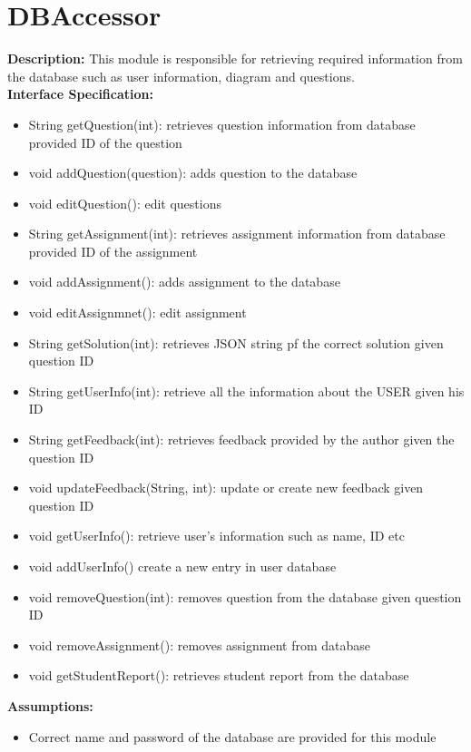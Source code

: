  
\chapter{DBAccessor}
\textbf{Description:}
This module is responsible for retrieving required information from the database such as user information, diagram and questions. \\
\textbf{Interface Specification:}
\begin{itemize}
\item        	String getQuestion(int): retrieves question information from database provided
ID of the question
\item	void addQuestion(question): adds question to the database
\item	void editQuestion(): edit questions
        \item	String getAssignment(int): retrieves assignment information from database provided ID of the assignment
\item	void addAssignment(): adds assignment to the database
	\item void editAssignmnet(): edit assignment
        \item 	String getSolution(int): retrieves JSON string pf the correct solution given question ID
        \item 	String getUserInfo(int): retrieve all the information about the USER given his ID
	\item String getFeedback(int): retrieves feedback provided by the author given the question ID
	\item void updateFeedback(String, int): update or create new feedback given question ID
        \item 	void getUserInfo(): retrieve user’s information such as name, ID etc
\item 	void addUserInfo() create a new entry in user database
\item 	void removeQuestion(int): removes question from the database given question ID
\item 	void removeAssignment(): removes assignment from database
\item 	void getStudentReport(): retrieves student report from
the database\\
\end{itemize}
\textbf{Assumptions:}
\begin{itemize}
        \item	Correct name and password of the database are provided for this module
        \end{itemize}
